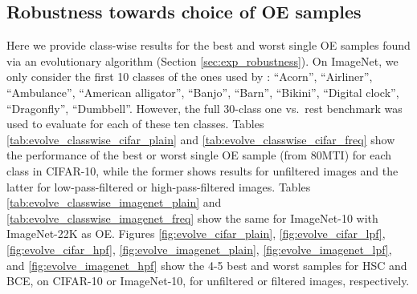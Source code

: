 \documentclass[10pt]{article} \usepackage[accepted]{stylefiles/tmlr}
\begin{document}
\subsection{Robustness towards choice of OE samples}
Here we provide class-wise results for the best and worst single OE samples found via an evolutionary algorithm (Section \ref{sec:exp_robustness}).
On ImageNet, we only consider the first 10 classes of the ones used by \citep{hendrycks2019using}: ``Acorn'', ``Airliner'', ``Ambulance'', ``American alligator'', ``Banjo'', ``Barn'', ``Bikini'', ``Digital clock'', ``Dragonfly'', ``Dumbbell''. 
However, the full 30-class one vs.~rest benchmark was used to evaluate for each of these ten classes.
Tables \ref{tab:evolve_classwise_cifar_plain} and \ref{tab:evolve_classwise_cifar_freq} show the performance of the best or worst single OE sample (from 80MTI) for each class in CIFAR-10, while the former shows results for unfiltered images and the latter for low-pass-filtered or high-pass-filtered images.
Tables \ref{tab:evolve_classwise_imagenet_plain} and \ref{tab:evolve_classwise_imagenet_freq} show the same for ImageNet-10 with ImageNet-22K as OE.
Figures \ref{fig:evolve_cifar_plain}, \ref{fig:evolve_cifar_lpf}, \ref{fig:evolve_cifar_hpf}, \ref{fig:evolve_imagenet_plain}, \ref{fig:evolve_imagenet_lpf}, and \ref{fig:evolve_imagenet_hpf} show the 4-5 best and worst samples for HSC and BCE, on CIFAR-10 or ImageNet-10, for unfiltered or filtered images, respectively. 
\end{document}

